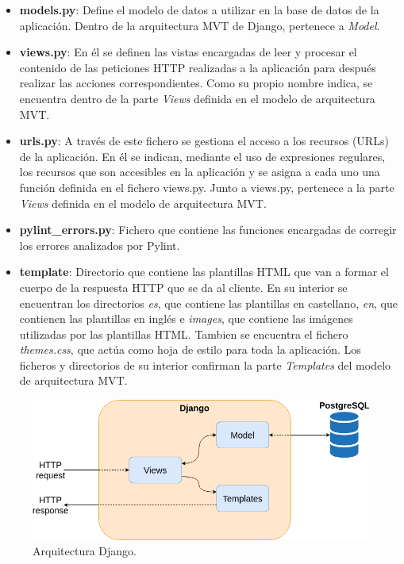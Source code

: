 \documentclass[a4paper, 12pt]{book}
\begin{document}
\begin{itemize}
	\item \textbf{models.py}:  Define el modelo de datos a utilizar en la base de datos de la aplicación. Dentro de la arquitectura MVT de Django, pertenece a \textit{Model}.
	\item \textbf{views.py}: En él se definen las vistas encargadas de leer y procesar el contenido de las peticiones HTTP realizadas a la aplicación para después realizar las acciones correspondientes.
	Como su propio nombre indica, se encuentra dentro de la parte \textit{Views} definida en el modelo de arquitectura MVT.
	\item \textbf{urls.py}: A través de este fichero se gestiona el acceso a los recursos (URLs) de la aplicación.
	En él se indican, mediante el uso de expresiones regulares, los recursos que son accesibles en la aplicación y se asigna a cada uno una función definida en el fichero views.py. Junto a views.py, pertenece a la parte \textit{Views} definida en el modelo de arquitectura MVT.
	\item \textbf{pylint\_errors.py}: Fichero que contiene las funciones encargadas de corregir los errores analizados por Pylint.
	\item \textbf{template}: Directorio que contiene las plantillas HTML que van a formar el cuerpo de la respuesta HTTP que se da al cliente. En su interior se encuentran los directorios \textit{es}, que contiene las plantillas en castellano, \textit{en}, que contienen las plantillas en inglés e \textit{images}, que contiene las imágenes utilizadas por las plantillas HTML. Tambien se encuentra el fichero \textit{themes.css}, que actúa como hoja de estilo para toda la aplicación. Los ficheros y directorios de su interior confirman la parte \textit{Templates} del modelo de arquitectura MVT.
\end{itemize}

\begin{figure}
  \centering
  \includegraphics[width=12cm, keepaspectratio]{img/django.png}
  \caption{Arquitectura Django.}\label{fig:django}
\end{figure}
\end{document}
